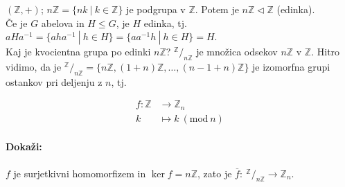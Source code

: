 \begin{zgled}
$(\mathbb{Z}, +)$; $n\mathbb{Z} = \{nk\ |\ k \in \mathbb{Z}\}$ je podgrupa v $\mathbb{Z}$. Potem je $n\mathbb{Z} \lhd \mathbb{Z}$ (edinka).\\[6pt]

 \v Ce je $G$ abelova in $H \leq G$, je $H$ edinka, tj. $aHa^{-1} = \{aha^{-1}\ |\ h \in H\} = \{aa^{-1}h\ |\ h\in H\} = H$.\\[6pt]

\ni Kaj je kvocientna grupa po edinki $n\mathbb{Z}$? $^{\mathbb{Z}}/_{n\mathbb{Z}}$ je mno\v zica odsekov $n\mathbb{Z}$ v $\mathbb{Z}$. Hitro vidimo,
da je $^{\mathbb{Z}}/_{n\mathbb{Z}} = \{n\mathbb{Z}, (1 + n)\mathbb{Z}, \ldots, (n - 1 + n)\mathbb{Z}\}$ je izomorfna grupi ostankov pri deljenju z $n$, tj.

\begin{align*}
	f:\mathbb{Z} &\to \mathbb{Z}_n\\
	k &\mapsto k\ (\text{mod}\ n)
\end{align*}

\paragraph{Doka\v zi:} $f$ je surjetkivni homomorfizem in $\ker f = n\mathbb{Z}$, zato je $\overline{f}:\ ^{\mathbb{Z}}/_{n\mathbb{Z}} \to \mathbb{Z}_n.$
\end{zgled}

